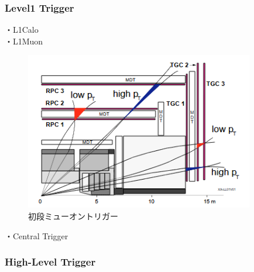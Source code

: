 \subsubsection{Level1 Trigger}
・L1Calo\\
・L1Muon\\
\begin{figure}[tb]
  \centering
  \includegraphics[clip, width=10cm]{fig/3/muon_trigger_overview.png}
  \caption{初段ミューオントリガー}
  \label{fig:muon}
\end{figure}

・Central Trigger
\subsubsection{High-Level Trigger}






